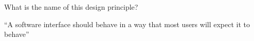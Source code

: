 What is the name of this design principle?
\begin{center}
    \begin{minipage}{0.8\textwidth}
        \begin{center}
        ``A software interface should behave in a way that most users will expect it to behave''
        \end{center}
    \end{minipage}
\end{center}
